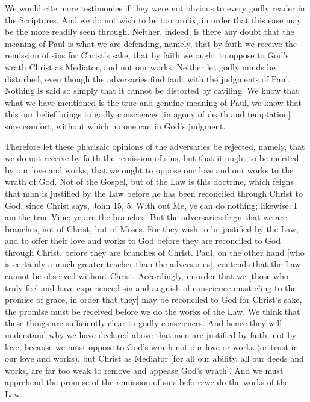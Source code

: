 We would cite more testimonies if they were not obvious to every
godly reader in the Scriptures.  And we do not wish to be too prolix,
in order that this ease may be the more readily seen through.
Neither, indeed, is there any doubt that the meaning of Paul is what
we are defending, namely, that by faith we receive the remission of
sins for Christ's sake, that by faith we ought to oppose to God's
wrath Christ as Mediator, and not our works.  Neither let godly minds
be disturbed, even though the adversaries find fault with the
judgments of Paul.  Nothing is said so simply that it cannot be
distorted by caviling.  We know that what we have mentioned is the
true and genuine meaning of Paul, we know that this our belief brings
to godly consciences [in agony of death and temptation] sure comfort,
without which no one can in God's judgment.

Therefore let these pharisaic opinions of the adversaries be rejected,
namely, that we do not receive by faith the remission of sins, but
that it ought to be merited by our love and works; that we ought to
oppose our love and our works to the wrath of God.  Not of the Gospel,
but of the Law is this doctrine, which feigns that man is justified
by the Law before he has been reconciled through Christ to God, since
Christ says, John 15, 5: With out Me, ye can do nothing; likewise: I
am the true Vine; ye are the branches.  But the adversaries feign
that we are branches, not of Christ, but of Moses.  For they wish to
be justified by the Law, and to offer their love and works to God
before they are reconciled to God through Christ, before they are
branches of Christ.  Paul, on the other hand [who is certainly a much
greater teacher than the adversaries], contends that the Law cannot
be observed without Christ.  Accordingly, in order that we [those who
truly feel and have experienced sin and anguish of conscience must
cling to the promise of grace, in order that they] may be reconciled
to God for Christ's sake, the promise must be received before we do
the works of the Law.  We think that these things are sufficiently
clear to godly consciences.  And hence they will understand why we
have declared above that men are justified by faith, not by love,
because we must oppose to God's wrath not our love or works (or trust
in our love and works), but Christ as Mediator [for all our ability,
all our deeds and works, are far too weak to remove and appease God's
wrath].  And we must apprehend the promise of the remission of sins
before we do the works of the Law.

